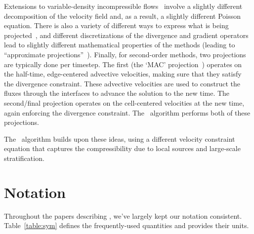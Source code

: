 Extensions to variable-density incompressible
flows~\cite{bellMarcus:1992b} involve a slightly different
decomposition of the velocity field and, as a result, a slightly
different Poisson equation.  There is also a variety of different ways
to express what is being projected~\cite{almgren:bell:crutchfield},
and different discretizations of the divergence and gradient operators
lead to slightly different mathematical properties of the methods
(leading to ``approximate
projections''~\cite{almgrenBellSzymczak:1996}).  Finally, for
second-order methods, two projections are typically done per timestep.
The first (the `MAC' projection~\cite{bellColellaHowell:1991})
operates on the half-time, edge-centered advective velocities, making
sure that they satisfy the divergence constraint.  These advective
velocities are used to construct the fluxes through the interfaces to
advance the solution to the new time.  The second/final projection
operates on the cell-centered velocities at the new time, again
enforcing the divergence constraint.  The \maestro\ algorithm performs
both of these projections.

The \maestro\ algorithm builds upon these ideas, using a different
velocity constraint equation that captures the compressibility
due to local sources and large-scale stratification.



\section{Notation}

Throughout the papers describing \maestro, we've largely kept our
notation consistent.  Table~\ref{table:sym} defines the
frequently-used quantities and provides their units.




